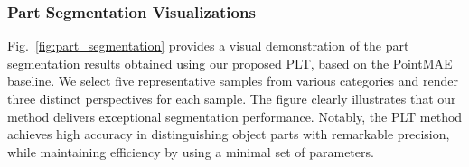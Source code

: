 

\subsubsection{Part Segmentation Visualizations}  
Fig.~\ref{fig:part_segmentation} provides a visual demonstration of the part segmentation results obtained using our proposed PLT, based on the PointMAE~\cite{pang2022masked} baseline. We select five representative samples from various categories and render three distinct perspectives for each sample. The figure clearly illustrates that our method delivers exceptional segmentation performance. Notably, the PLT method achieves high accuracy in distinguishing object parts with remarkable precision, while maintaining efficiency by using a minimal set of parameters.

